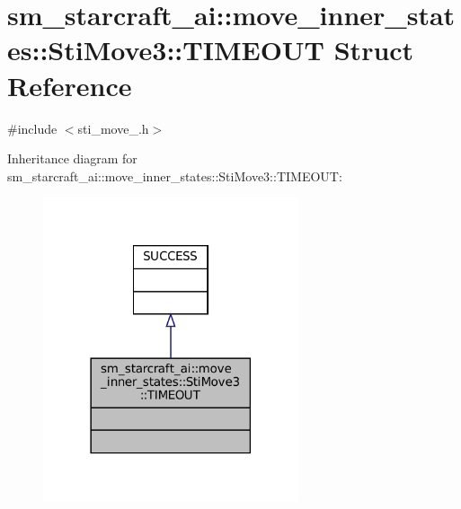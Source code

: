 \hypertarget{structsm__starcraft__ai_1_1move__inner__states_1_1StiMove3_1_1TIMEOUT}{}\section{sm\+\_\+starcraft\+\_\+ai\+:\+:move\+\_\+inner\+\_\+states\+:\+:Sti\+Move3\+:\+:T\+I\+M\+E\+O\+UT Struct Reference}
\label{structsm__starcraft__ai_1_1move__inner__states_1_1StiMove3_1_1TIMEOUT}


{\ttfamily \#include $<$sti\+\_\+move\+\_.\+h$>$}



Inheritance diagram for sm\+\_\+starcraft\+\_\+ai\+:\+:move\+\_\+inner\+\_\+states\+:\+:Sti\+Move3\+:\+:T\+I\+M\+E\+O\+UT\+:
\nopagebreak
\begin{figure}[H]
\begin{center}
\leavevmode
\includegraphics[width=213pt]{structsm__starcraft__ai_1_1move__inner__states_1_1StiMove3_1_1TIMEOUT__inherit__graph}
\end{center}
\end{figure}



